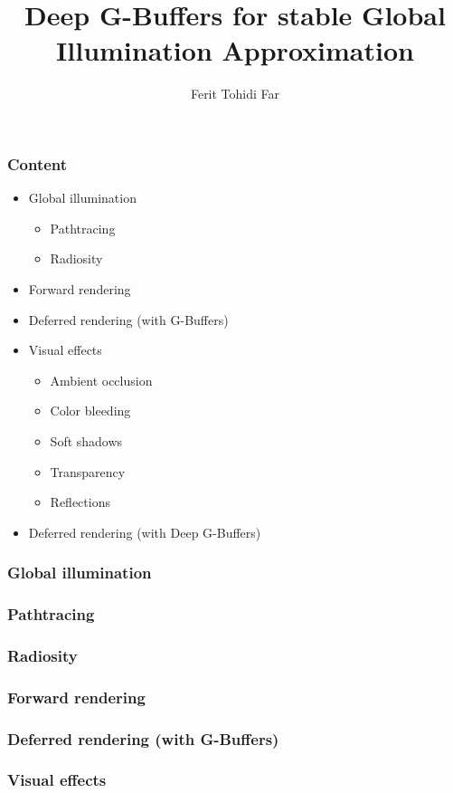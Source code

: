 \documentclass{beamer}
\title{Deep G-Buffers for stable Global Illumination Approximation}
\author{Ferit Tohidi Far}
\begin{document}
	\maketitle

	\begin{frame}
		\frametitle{Content}
		\begin{itemize}
			\item Global illumination
				\begin{itemize}
					\item Pathtracing
					\item Radiosity
				\end{itemize}
			\item Forward rendering
			\item Deferred rendering (with G-Buffers)
			\item Visual effects
				\begin{itemize}
					\item Ambient occlusion
					\item Color bleeding
					\item Soft shadows
					\item Transparency
					\item Reflections
				\end{itemize}
			\item Deferred rendering (with Deep G-Buffers)
		\end{itemize}
	\end{frame}

	\begin{frame}
		\frametitle{Global illumination}
	\end{frame}

	\begin{frame}
		\frametitle{Pathtracing}
	\end{frame}

	\begin{frame}
		\frametitle{Radiosity}
	\end{frame}

	\begin{frame}
		\frametitle{Forward rendering}
	\end{frame}

	\begin{frame}
		\frametitle{Deferred rendering (with G-Buffers)}
	\end{frame}

	\begin{frame}
		\frametitle{Visual effects}
	\end{frame}
\end{document}
